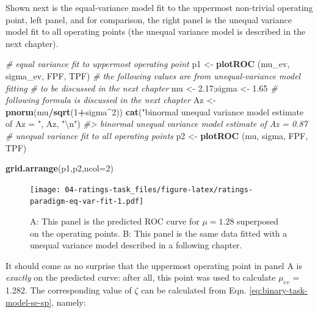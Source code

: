 \documentclass[
]{book}
\newenvironment{Shaded}{\begin{snugshade}}{\end{snugshade}}
\newcommand{\CharTok}[1]{\textcolor[rgb]{0.31,0.60,0.02}{#1}}
\newcommand{\CommentTok}[1]{\textcolor[rgb]{0.56,0.35,0.01}{\textit{#1}}}
\newcommand{\DataTypeTok}[1]{\textcolor[rgb]{0.13,0.29,0.53}{#1}}
\newcommand{\DecValTok}[1]{\textcolor[rgb]{0.00,0.00,0.81}{#1}}
\newcommand{\FloatTok}[1]{\textcolor[rgb]{0.00,0.00,0.81}{#1}}
\newcommand{\KeywordTok}[1]{\textcolor[rgb]{0.13,0.29,0.53}{\textbf{#1}}}
\newcommand{\NormalTok}[1]{#1}
\newcommand{\OperatorTok}[1]{\textcolor[rgb]{0.81,0.36,0.00}{\textbf{#1}}}
\newcommand{\StringTok}[1]{\textcolor[rgb]{0.31,0.60,0.02}{#1}}
\begin{document}
Shown next is the equal-variance model fit to the uppermost non-trivial operating point, left panel, and for comparison, the right panel is the unequal variance model fit to all operating points (the unequal variance model is described in the next chapter).

\begin{Shaded}
\begin{Highlighting}[]
\CommentTok{# equal variance fit to uppermost operating point}
\NormalTok{p1 <-}\StringTok{ }\KeywordTok{plotROC}\NormalTok{ (mu_ev, sigma_ev, FPF, TPF)}
\CommentTok{# the following values are from unequal-variance model fitting}
\CommentTok{# to be discussed in the next chapter}
\NormalTok{mu <-}\StringTok{ }\FloatTok{2.17}\NormalTok{;sigma <-}\StringTok{ }\FloatTok{1.65}
\CommentTok{# following formula is discussed in the next chapter}
\NormalTok{Az <-}\StringTok{ }\KeywordTok{pnorm}\NormalTok{(mu}\OperatorTok{/}\KeywordTok{sqrt}\NormalTok{(}\DecValTok{1}\OperatorTok{+}\NormalTok{sigma}\OperatorTok{^}\DecValTok{2}\NormalTok{))}
\KeywordTok{cat}\NormalTok{(}\StringTok{"binormal unequal variance model estimate of Az = "}\NormalTok{, Az, }\StringTok{"}\CharTok{\textbackslash{}n}\StringTok{"}\NormalTok{)}
\CommentTok{#> binormal unequal variance model estimate of Az =  0.87}
\CommentTok{# unequal variance fit to all operating points}
\NormalTok{p2 <-}\StringTok{ }\KeywordTok{plotROC}\NormalTok{ (mu, sigma, FPF, TPF)}
\end{Highlighting}
\end{Shaded}

\begin{Shaded}
\begin{Highlighting}[]
\KeywordTok{grid.arrange}\NormalTok{(p1,p2,}\DataTypeTok{ncol=}\DecValTok{2}\NormalTok{)}
\end{Highlighting}
\end{Shaded}

\begin{figure}
\centering
\texttt{[image: 04-ratings-task\_files/figure-latex/ratings-paradigm-eq-var-fit-1.pdf]}
\caption{\label{fig:ratings-paradigm-eq-var-fit}A: This panel is the predicted ROC curve for \(\mu=1.28\) superposed on the operating points. B: This panel is the same data fitted with a unequal variance model described in a following chapter.}
\end{figure}

It should come as no surprise that the uppermost operating point in panel A is \emph{exactly} on the predicted curve: after all, this point was used to calculate \(\mu_{ev}\) = 1.282. The corresponding value of \(\zeta\) can be calculated from Eqn. \eqref{eq:binary-task-model-se-sp}, namely:
\end{document}
